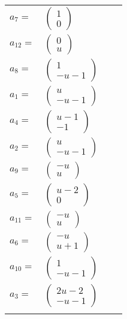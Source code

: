 \documentclass[1p]{elsarticle_modified}
\theoremstyle{definition}
\begin{document}
\begin{tabular}{m{7pt} m{180pt} m{7pt} m{180pt} }
\flushright $a_{7}=$&$\begin{pmatrix}1\\0\end{pmatrix}$ \\
\flushright $a_{12}=$&$\begin{pmatrix}0\\u\end{pmatrix}$ \\
\flushright $a_{8}=$&$\begin{pmatrix}1\\- u-1\end{pmatrix}$ \\
\flushright $a_{1}=$&$\begin{pmatrix}u\\- u-1\end{pmatrix}$ \\
\flushright $a_{4}=$&$\begin{pmatrix}u-1\\-1\end{pmatrix}$ \\
\flushright $a_{2}=$&$\begin{pmatrix}u\\- u-1\end{pmatrix}$ \\
\flushright $a_{9}=$&$\begin{pmatrix}- u\\u\end{pmatrix}$ \\
\flushright $a_{5}=$&$\begin{pmatrix}u-2\\0\end{pmatrix}$ \\
\flushright $a_{11}=$&$\begin{pmatrix}- u\\u\end{pmatrix}$ \\
\flushright $a_{6}=$&$\begin{pmatrix}- u\\u+1\end{pmatrix}$ \\
\flushright $a_{10}=$&$\begin{pmatrix}1\\- u-1\end{pmatrix}$ \\
\flushright $a_{3}=$&$\begin{pmatrix}2 u-2\\- u-1\end{pmatrix}$\\&\end{tabular}
\end{document}
